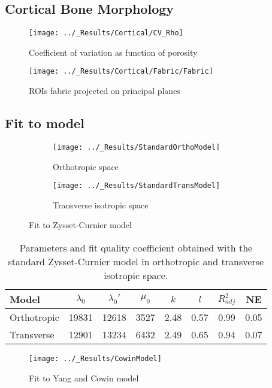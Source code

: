 \documentclass[a4paper,fleqn]{DC_ArtStyle}
\begin{document}
	\subsection{Cortical Bone Morphology}
	\begin{figure}
		\centering
			\texttt{[image: ../\_Results/Cortical/CV\_Rho]}
			\caption{Coefficient of variation as function of porosity}
	\end{figure}
	\begin{figure*}
		\centering
		\texttt{[image: ../\_Results/Cortical/Fabric/Fabric]}
		\caption{ROIs fabric projected on principal planes}
	\end{figure*}
	
	\clearpage
	\subsection{Fit to model}
	\begin{figure*}
		\centering
		\begin{subfigure}[t]{.45\linewidth}
			\texttt{[image: ../\_Results/StandardOrthoModel]}
			\caption{Orthotropic space}
		\end{subfigure}
		\begin{subfigure}[t]{.45\linewidth}
			\texttt{[image: ../\_Results/StandardTransModel]}
			\caption{Transverse isotropic space}
		\end{subfigure}
		\caption{Fit to Zysset-Curnier model}
	\end{figure*}
	\begin{table}[!h]
		\centering
		\caption{Parameters and fit quality coefficient obtained with the standard Zysset-Curnier model in orthotropic and transverse isotropic space.}
		\label{TabZysset}
		\begin{tabular}{l|c|c|c|c|c|c|c}
		\toprule
			Model & $\lambda_0$ & $\lambda_0'$ & $\mu_0$ &  $k$ &  $l$ & $R^2_{adj}$ &   NE \\
		\midrule
		Orthotropic &       19831 &        12618 &    3527 & 2.48 & 0.57 &        0.99 & 0.05 \\
		Transverse &       12901 &        13234 &    6432 & 2.49 & 0.65 &        0.94 & 0.07 \\
		\bottomrule
		\end{tabular}
	\end{table}

	\begin{figure*}
		\centering
			\texttt{[image: ../\_Results/CowinModel]}
			\caption{Fit to Yang and Cowin model}
	\end{figure*}
\end{document}
